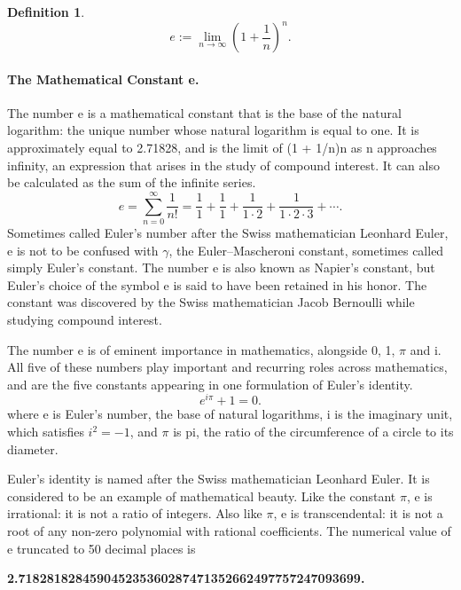 \documentclass[a4paper,12pt]{article} %
\newtheorem{definition}{Definition}[section]
\begin{document}
\begin{definition}
    \[e:= \lim_{n \to \infty} \left(1+\frac{1}{n}\right)^n.\]
\end{definition}

\paragraph{{\rm \textbf{The Mathematical Constant e.}}}
The number e is a mathematical constant that is the base of the natural 
logarithm: the unique number whose natural logarithm is equal to one. 
It is approximately equal to 2.71828, and is the limit of (1 + 1/n)n 
as n approaches infinity, an expression that arises in the study of compound 
interest. It can also be calculated as the sum of the infinite series.
\[
    e= \sum \limits _{n=0}^{\infty }\dfrac {1}{n!}
     =\frac {1}{1}+\frac {1}{1}+\frac {1}{1\cdot 2}+\frac {1}{1\cdot 2\cdot 3}+\cdots .
\]
Sometimes called Euler's number after the Swiss mathematician Leonhard Euler, 
e is not to be confused with $\gamma$, the Euler–Mascheroni constant, sometimes called 
simply Euler's constant. The number e is also known as Napier's constant, 
but Euler's choice of the symbol e is said to have been retained in his honor.
The constant was discovered by the Swiss mathematician Jacob Bernoulli while 
studying compound interest.

The number e is of eminent importance in mathematics, alongside 0, 1, $\pi$ and i. 
All five of these numbers play important and recurring roles across mathematics,
and are the five constants appearing in one formulation of Euler's identity. 
\[
    e^{i\pi} + 1 = 0.
    \]
where e is Euler's number, the base of natural logarithms,
i is the imaginary unit, which satisfies $i^2 = -1$, and
$\pi$ is pi, the ratio of the circumference of a circle to its diameter.

Euler's identity is named after the Swiss mathematician Leonhard Euler. 
It is considered to be an example of mathematical beauty.
Like the constant $\pi$, e is irrational: it is not a ratio of integers. Also 
like $\pi$, e is transcendental: it is not a root of any non-zero polynomial 
with rational coefficients. The numerical value of e truncated to 50 decimal places is


\textbf{2.718281828459045235360287471352662497757247093699.}
\end{document}
